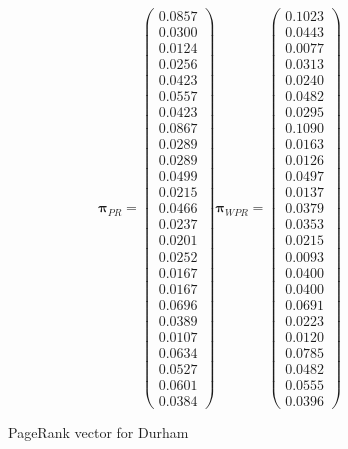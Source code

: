 \documentclass[11pt]{report}
\begin{document}
\begin{appendices}
\begin{figure} [H]  
\begin{equation} 
\boldsymbol\pi_{PR} = \left(
\begin{array}{c}
0.0857\\
0.0300\\
0.0124\\
0.0256\\
0.0423\\
0.0557\\
0.0423\\
0.0867\\
0.0289\\
0.0289\\
0.0499\\
0.0215\\
0.0466\\
0.0237\\
0.0201\\
0.0252\\
0.0167\\
0.0167\\
0.0696\\
0.0389\\
0.0107\\
0.0634\\
0.0527\\
0.0601\\
0.0384
\end{array}
\right)    
\boldsymbol\pi_{WPR} = \left(
\begin{array}{c}
0.1023 \\
0.0443 \\
0.0077 \\
0.0313 \\
0.0240 \\
0.0482 \\
0.0295 \\
0.1090 \\
0.0163 \\
0.0126 \\
0.0497 \\
0.0137 \\
0.0379 \\
0.0353 \\
0.0215 \\
0.0093 \\
0.0400 \\
0.0400 \\
0.0691 \\
0.0223 \\
0.0120 \\
0.0785 \\
0.0482 \\
0.0555 \\
0.0396 
\end{array}
\right)
\end{equation} 
\caption{PageRank vector for Durham}
\end{figure}  \label{fig:DPR}


\end{appendices}
\end{document}
